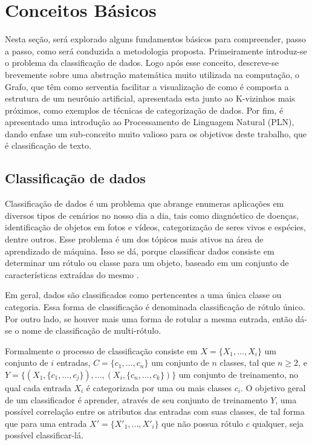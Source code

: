 \chapter{Conceitos Básicos} %
Nesta seção, será explorado alguns fundamentos básicos para compreender, passo a passo, como será conduzida a metodologia proposta. Primeiramente introduz-se o problema da classificação de dados. Logo após esse conceito, descreve-se brevemente sobre uma abstração matemática muito utilizada na computação, o Grafo, que têm como serventia facilitar a visualização de como é composta a estrutura de um neurônio artificial, apresentada esta junto ao K-vizinhos mais próximos, como exemplos de técnicas de categorização de dados. Por fim, é apresentado uma introdução ao Processamento de Linguagem Natural (PLN), dando enfase um sub-conceito muito valioso para os objetivos deste trabalho, que é classificação de texto.

\section{Classificação de dados}
Classificação de dados é um problema que abrange enumeras aplicações em diversos tipos de cenários no nosso dia a dia, tais como diagnóstico de doenças, identificação de objetos em fotos e vídeos, categorização de seres vivos e espécies, dentre outros. Esse problema é um dos tópicos mais ativos na área de aprendizado de máquina. Isso se dá, porque classificar dados consiste em determinar um rótulo ou classe para um objeto, baseado em um conjunto de características extraídas do mesmo \citep{duda1973pattern,bishop2006pattern}. 

Em geral, dados são classificados como pertencentes a uma única classe ou categoria. Essa forma de classificação é denominada classificação de rótulo único. Por outro lado, se houver mais uma forma de rotular a mesma entrada, então dá-se o nome de classificação de multi-rótulo. 

Formalmente o processo de classificação consiste em $X = \{X_1,...,X_i\}$ um conjunto de $i$ entradas, $C = \{c_1,...,c_n\}$ um conjunto de $n$ classes, tal que $n \geq 2$, e $Y = \{(X_1, \{c_1,...,c_j\}),...,(X_i, \{c_n,...,c_k\})\}$ um conjunto de treinamento, no qual cada entrada $X_i$ é categorizada por uma ou mais classes $c_i$. O objetivo geral de um classificador é aprender, através de seu conjunto de treinamento $Y$, uma possível correlação entre os atributos das entradas com suas classes, de tal forma que para uma entrada $X' = \{X'_1,...,X'_i\}$ que não possua rótulo $c$ qualquer, seja possível classificar-lá.

